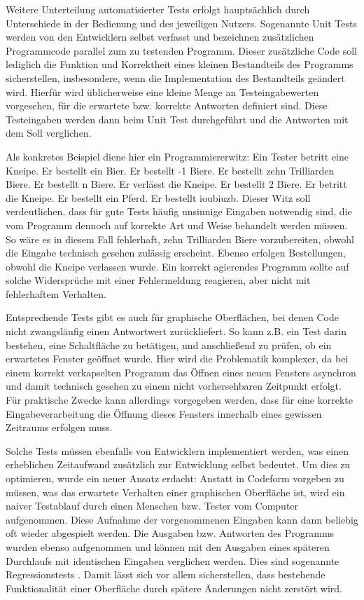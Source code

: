Weitere Unterteilung automatisierter Tests erfolgt hauptsächlich durch Unterschiede
in der Bedienung und des jeweiligen Nutzers. Sogenannte \glqq{}Unit Tests\grqq{} werden
von den Entwicklern selbst verfasst und bezeichnen zusätzlichen Programmcode parallel
zum zu testenden Programm. Dieser zusätzliche Code soll lediglich die Funktion und Korrektheit
eines kleinen Bestandteils des Programms sicherstellen, insbesondere, wenn die Implementation
des Bestandteils geändert wird. Hierfür wird üblicherweise eine kleine Menge an Testeingabewerten
vorgesehen, für die erwartete bzw. korrekte Antworten definiert sind. Diese Testeingaben
werden dann beim Unit Test durchgeführt und die Antworten mit dem Soll verglichen.

Als konkretes Beispiel diene hier ein Programmiererwitz: Ein Tester betritt eine Kneipe.
Er bestellt ein Bier. Er bestellt -1 Biere. Er bestellt zehn Trilliarden Biere. Er bestellt n Biere.
Er verlässt die Kneipe. Er bestellt 2 Biere. Er betritt die Kneipe. Er bestellt ein Pferd. Er bestellt \glqq{}ioubiuzb\grqq{}.
Dieser Witz soll verdeutlichen, dass für gute Tests häufig unsinnige Eingaben notwendig sind,
die vom Programm dennoch auf korrekte Art und Weise behandelt werden müssen. So wäre es in diesem
Fall fehlerhaft, zehn Trilliarden Biere vorzubereiten, obwohl die Eingabe technisch gesehen zulässig erscheint.
Ebenso erfolgen Bestellungen, obwohl die Kneipe verlassen wurde. Ein korrekt agierendes
Programm sollte auf solche Widersprüche mit einer Fehlermeldung reagieren, aber nicht mit
fehlerhaftem Verhalten.

Entsprechende Tests gibt es auch für graphische Oberflächen, bei denen Code nicht zwangsläufig
einen Antwortwert zurückliefert. So kann z.B. ein Test darin bestehen, eine Schaltfläche zu betätigen,
und anschließend zu prüfen, ob ein erwartetes Fenster geöffnet wurde. Hier wird die Problematik
komplexer, da bei einem korrekt verkapselten Programm das Öffnen eines neuen Fensters asynchron
und damit technisch gesehen zu einem nicht vorhersehbaren Zeitpunkt erfolgt. Für praktische Zwecke
kann allerdings vorgegeben werden, dass für eine korrekte Eingabeverarbeitung die Öffnung dieses 
Fensters innerhalb eines gewissen Zeitraums erfolgen muss.

Solche Tests müssen ebenfalls von Entwicklern implementiert werden, was einen erheblichen
Zeitaufwand zusätzlich zur Entwicklung selbst bedeutet. Um dies zu optimieren, wurde ein neuer Ansatz erdacht: Anstatt
in Codeform vorgeben zu müssen, was das erwartete Verhalten einer graphischen Oberfläche ist,
wird ein naiver Testablauf durch einen Menschen bzw. Tester vom Computer aufgenommen. Diese Aufnahme der
vorgenommenen Eingaben kann dann beliebig oft wieder abgespielt werden. Die Ausgaben bzw.
Antworten des Programms wurden ebenso aufgenommen und können mit den Ausgaben eines späteren
Durchlaufs mit identischen Eingaben verglichen werden. Dies sind sogenannte 
\glqq{}Regressionstests\grqq{} \cite{regression}. Damit lässt sich vor allem sicherstellen,
dass bestehende Funktionalität einer Oberfläche durch spätere Änderungen nicht zerstört wird.

